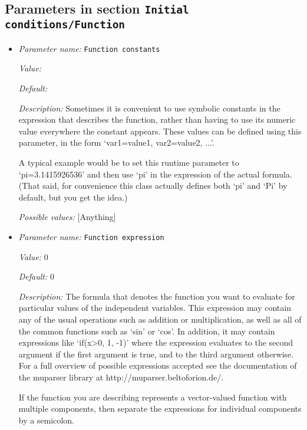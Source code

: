 \subsection{Parameters in section \tt Initial conditions/Function}
\label{parameters:Initial_20conditions/Function}

\begin{itemize}
\item {\it Parameter name:} {\tt Function constants}
\label{parameters:Initial conditions/Function/Function constants}


{\it Value:} 


{\it Default:} 


{\it Description:} Sometimes it is convenient to use symbolic constants in the expression that describes the function, rather than having to use its numeric value everywhere the constant appears. These values can be defined using this parameter, in the form `var1=value1, var2=value2, ...'.

A typical example would be to set this runtime parameter to `pi=3.1415926536' and then use `pi' in the expression of the actual formula. (That said, for convenience this class actually defines both `pi' and `Pi' by default, but you get the idea.)


{\it Possible values:} [Anything]
\item {\it Parameter name:} {\tt Function expression}
\label{parameters:Initial conditions/Function/Function expression}


{\it Value:} 0


{\it Default:} 0


{\it Description:} The formula that denotes the function you want to evaluate for particular values of the independent variables. This expression may contain any of the usual operations such as addition or multiplication, as well as all of the common functions such as `sin' or `cos'. In addition, it may contain expressions like `if(x>0, 1, -1)' where the expression evaluates to the second argument if the first argument is true, and to the third argument otherwise. For a full overview of possible expressions accepted see the documentation of the muparser library at http://muparser.beltoforion.de/.

If the function you are describing represents a vector-valued function with multiple components, then separate the expressions for individual components by a semicolon.



\end{itemize}
